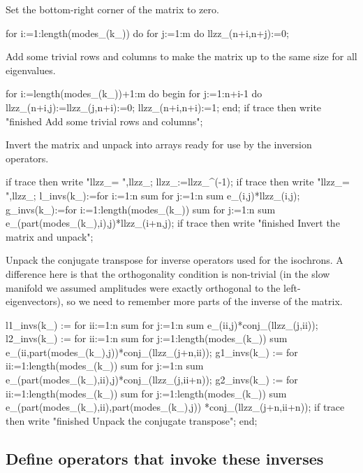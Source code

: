 \documentclass[11pt,a5paper]{article}
\begin{document}
Set the bottom-right corner of the matrix to zero.
\begin{reduce}
  for i:=1:length(modes_(k_)) do 
    for j:=1:m do llzz_(n+i,n+j):=0;
\end{reduce}

Add some trivial rows and columns to make the matrix up to
the same size for all eigenvalues.
\begin{reduce}
  for i:=length(modes_(k_))+1:m do begin 
    for j:=1:n+i-1 do llzz_(n+i,j):=llzz_(j,n+i):=0;
    llzz_(n+i,n+i):=1;
  end;
  if trace then write 
  "finished Add some trivial rows and columns";
\end{reduce}

Invert the matrix and unpack into arrays ready for use by
the inversion operators.
\begin{reduce}
  if trace then write "llzz_= ",llzz_; 
  llzz_:=llzz_^(-1);
  if trace then write "llzz_= ",llzz_;
  l_invs(k_):=for i:=1:n sum for j:=1:n sum e_(i,j)*llzz_(i,j);
  g_invs(k_):=for i:=1:length(modes_(k_)) sum 
    for j:=1:n sum e_(part(modes_(k_),i),j)*llzz_(i+n,j);
  if trace then write "finished Invert the matrix and unpack";
\end{reduce}

Unpack the conjugate transpose for inverse operators used
for the isochrons. A difference here is that the
orthogonality condition is non-trivial (in the slow manifold
we assumed amplitudes were exactly orthogonal to the
left-eigenvectors), so we need to remember more parts of the
inverse of the matrix.  
\begin{reduce}
  l1_invs(k_) := for ii:=1:n sum for j:=1:n sum 
      e_(ii,j)*conj_(llzz_(j,ii));
  l2_invs(k_) := for ii:=1:n sum 
      for j:=1:length(modes_(k_)) sum 
          e_(ii,part(modes_(k_),j))*conj_(llzz_(j+n,ii));
  g1_invs(k_) := for ii:=1:length(modes_(k_)) sum 
      for j:=1:n sum 
          e_(part(modes_(k_),ii),j)*conj_(llzz_(j,ii+n));
  g2_invs(k_) := for ii:=1:length(modes_(k_)) sum 
      for j:=1:length(modes_(k_)) sum 
          e_(part(modes_(k_),ii),part(modes_(k_),j))
          *conj_(llzz_(j+n,ii+n));
  if trace then write 
  "finished Unpack the conjugate transpose";
end;
\end{reduce}



\subsection{Define operators that invoke these inverses}
\end{document}
